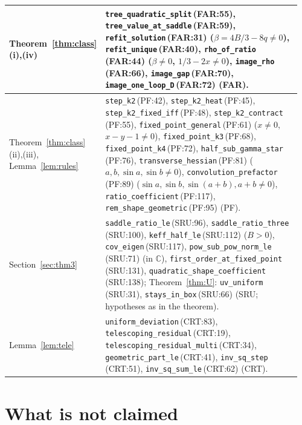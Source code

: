 \documentclass[11pt,a4paper]{article}
\theoremstyle{definition}
\theoremstyle{remark}
\newcommand{\code}[1]{\texttt{#1}}
\begin{document}
{\begin{longtable}{@{}p{0.2\linewidth}p{0.76\linewidth}@{}}
\midrule
Theorem~\ref{thm:class}(i),(iv) & \code{tree\_quadratic\_split}\,{\scriptsize(FAR:55)}, \code{tree\_value\_at\_saddle}\,{\scriptsize(FAR:59)}, \code{refit\_solution}\,{\scriptsize(FAR:31)} ($\beta=4B/3-8q\ne0$), \code{refit\_unique}\,{\scriptsize(FAR:40)}, \code{rho\_of\_ratio}\,{\scriptsize(FAR:44)} ($\beta\ne0$, $1/3-2x\ne0$), \code{image\_rho}\,{\scriptsize(FAR:66)}, \code{image\_gap}\,{\scriptsize(FAR:70)}, \code{image\_one\_loop\_D}\,{\scriptsize(FAR:72)} (FAR). \\
\midrule
Theorem~\ref{thm:class}(ii),(iii), Lemma~\ref{lem:rules} & \code{step\_k2}\,{\scriptsize(PF:42)}, \code{step\_k2\_heat}\,{\scriptsize(PF:45)}, \code{step\_k2\_fixed\_iff}\,{\scriptsize(PF:48)}, \code{step\_k2\_contract}\,{\scriptsize(PF:55)}, \code{fixed\_point\_general}\,{\scriptsize(PF:61)} ($x\ne0$, $x-y-1\ne0$), \code{fixed\_point\_k3}\,{\scriptsize(PF:68)}, \code{fixed\_point\_k4}\,{\scriptsize(PF:72)}, \code{half\_sub\_gamma\_star}\,{\scriptsize(PF:76)}, \code{transverse\_hessian}\,{\scriptsize(PF:81)} ($a,b,\sin a,\sin b\ne0$), \code{convolution\_prefactor}\,{\scriptsize(PF:89)} ($\sin a,\sin b,\sin(a+b),a+b\ne0$), \code{ratio\_coefficient}\,{\scriptsize(PF:117)}, \code{rem\_shape\_geometric}\,{\scriptsize(PF:95)} (PF). \\
\midrule
Section~\ref{sec:thm3} & \code{saddle\_ratio\_le}\,{\scriptsize(SRU:96)}, \code{saddle\_ratio\_three}\,{\scriptsize(SRU:100)}, \code{keff\_half\_le}\,{\scriptsize(SRU:112)} ($B>0$), \code{cov\_eigen}\,{\scriptsize(SRU:117)}, \code{pow\_sub\_\allowbreak{}pow\_norm\_le}\,{\scriptsize(SRU:71)} (in $\mathbb{C}$), \code{first\_order\_\allowbreak{}at\_fixed\_point}\,{\scriptsize(SRU:131)}, \code{quadratic\_shape\_\allowbreak{}coefficient}\,{\scriptsize(SRU:138)}; Theorem~\ref{thm:U}: \code{uv\_uniform}\,{\scriptsize(SRU:31)}, \code{stays\_in\_box}\,{\scriptsize(SRU:66)} (SRU; hypotheses as in the theorem). \\
\midrule
Lemma~\ref{lem:tele} & \code{uniform\_deviation}\,{\scriptsize(CRT:83)}, \code{telescoping\_residual}\,{\scriptsize(CRT:19)}, \code{telescoping\_residual\_multi}\,{\scriptsize(CRT:34)}, \code{geometric\_part\_le}\,{\scriptsize(CRT:41)}, \code{inv\_sq\_step}\,{\scriptsize(CRT:51)}, \code{inv\_sq\_sum\_le}\,{\scriptsize(CRT:62)} (CRT). \\
\bottomrule
\end{longtable}}

\section{What is not claimed}\label{sec:notclaimed}
\end{document}
